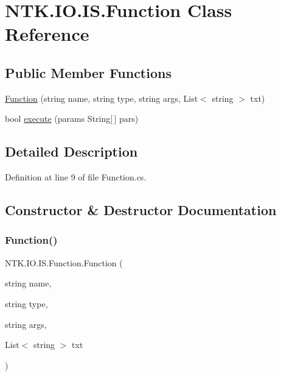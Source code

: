 \hypertarget{class_n_t_k_1_1_i_o_1_1_i_s_1_1_function}{}\section{N\+T\+K.\+I\+O.\+I\+S.\+Function Class Reference}
\label{class_n_t_k_1_1_i_o_1_1_i_s_1_1_function}
\subsection*{Public Member Functions}
\begin{DoxyCompactItemize}
\item 
\mbox{\hyperlink{class_n_t_k_1_1_i_o_1_1_i_s_1_1_function_a46856c4c081dee608911c75597be55d4}{Function}} (string name, string type, string args, List$<$ string $>$ txt)
\item 
bool \mbox{\hyperlink{class_n_t_k_1_1_i_o_1_1_i_s_1_1_function_a45caaf83c8d2a804829c36cb8e8ed90b}{execute}} (params String\mbox{[}$\,$\mbox{]} pars)
\end{DoxyCompactItemize}


\subsection{Detailed Description}


Definition at line 9 of file Function.\+cs.



\subsection{Constructor \& Destructor Documentation}
\mbox{\label{class_n_t_k_1_1_i_o_1_1_i_s_1_1_function_a46856c4c081dee608911c75597be55d4}} 
\subsubsection{\texorpdfstring{Function()}{Function()}}
{\footnotesize\ttfamily N\+T\+K.\+I\+O.\+I\+S.\+Function.\+Function (\begin{DoxyParamCaption}\item[{string}]{name,  }\item[{string}]{type,  }\item[{string}]{args,  }\item[{List$<$ string $>$}]{txt }\end{DoxyParamCaption})}



